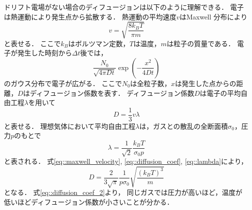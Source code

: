 \documentclass[../master]{subfiles}
\begin{document}
ドリフト電場がない場合のディフュージョンは以下のように理解できる．
電子は熱運動により発生点から拡散する．
熱運動の平均速度$v$はMaxwell 分布により
\begin{equation}
  v = \sqrt{\frac{8k_{B}T}{\pi m}}
  \label{eq::maxwell_velocity}
\end{equation}
と表せる．
ここで$k_{B}$はボルツマン定数，$T$は温度，$m$は粒子の質量である．
電子が発生した時刻から$\Delta t$後では，
\begin{equation}
  \frac{N_0}{\sqrt{4\pi D t}}\exp\left(-\frac{x^{2}}{4 D t}\right)
  \label{eq::gaus_dist}
\end{equation}
のガウス分布で電子が広がる．
ここで$N_{0}$は全粒子数，$x$は発生した点からの距離，$D$はディフュージョン係数を表す．
ディフュージョン係数$D$は電子の平均自由工程$\lambda$を用いて
\begin{equation}
  D = \frac{1}{3}v\lambda
  \label{eq::diffusion_coef}
\end{equation}
と表せる．
理想気体において平均自由工程$\lambda$は，ガスとの散乱の全断面積$\sigma_{0}$，圧力$p$のもとで
\begin{equation}
  \lambda = \frac{1}{\sqrt{2}}\frac{k_{B}T}{\sigma_{0}p}
  \label{eq::lambda}
\end{equation}
と表される．
式\ref{eq::maxwell_velocity}, \ref{eq::diffusion_coef}, \ref{eq::lambda}により，
\begin{equation}
  D = \frac{2}{3\sqrt{\pi}}\frac{1}{p\sigma_{0}}\sqrt{\frac{\left(k_{B}T\right)^{3}}{m}}
  \label{eq::diffusion_coef_2}
\end{equation}
となる．
式\ref{eq::diffusion_coef_2}より，
同じガスでは圧力が高いほど，温度が低いほどディフュージョン係数が小さいことが分かる．
\end{document}
